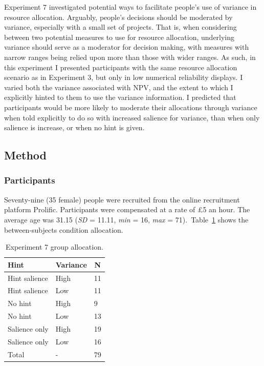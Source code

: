 \documentclass[a4paper, nobind, dvipsnames]{templates/ociamthesis}
\theoremstyle{definition}
\theoremstyle{definition}
\theoremstyle{definition}
\theoremstyle{definition}
\theoremstyle{remark}
\begin{document}
Experiment 7 investigated potential ways to facilitate people's use of variance
in resource allocation. Arguably, people's decisions should be moderated by
variance, especially with a small set of projects. That is, when considering
between two potential measures to use for resource allocation, underlying
variance should serve as a moderator for decision making, with measures with
narrow ranges being relied upon more than those with wider ranges. As such, in
this experiment I presented participants with the same resource allocation
scenario as in Experiment 3, but only in low numerical reliability displays. I
varied both the variance associated with NPV, and the extent to which I
explicitly hinted to them to use the variance information. I predicted that
participants would be more likely to moderate their allocations through variance
when told explicitly to do so with increased salience for variance, than when
only salience is increase, or when no hint is given.

\hypertarget{method-15}{%
\subsection{Method}\label{method-15}}

\hypertarget{participants-15}{%
\subsubsection{Participants}\label{participants-15}}

Seventy-nine (35 female) people were recruited from the online recruitment platform Prolific. Participants were compensated at a rate of £5 an hour. The average age was 31.15 (\emph{SD} = 11.11, \emph{min} = 16, \emph{max} = 71).~Table~\ref{tab:condition-allocation-alignment-6}
shows the between-subjects condition allocation.

\begin{table}[tbp]

\begin{center}
\begin{threeparttable}

\caption{\label{tab:condition-allocation-alignment-6}Experiment 7 group allocation.}

\begin{tabular}{lll}
\toprule
Hint & \multicolumn{1}{c}{Variance} & \multicolumn{1}{c}{N}\\
\midrule
Hint salience & High & 11\\
Hint salience & Low & 11\\
No hint & High & 9\\
No hint & Low & 13\\
Salience only & High & 19\\
Salience only & Low & 16\\
Total & - & 79\\
\bottomrule
\end{tabular}

\end{threeparttable}
\end{center}

\end{table}
\end{document}
